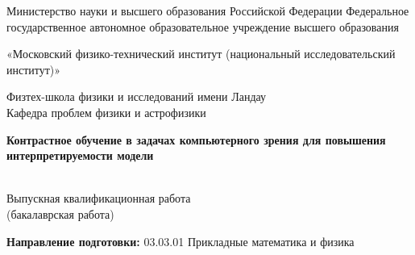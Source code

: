 \begin{titlepage}
    	\begin{center}
        		Министерство науки и высшего образования Российской Федерации Федеральное государственное автономное образовательное учреждение высшего образования
       
		«Московский физико-технический институт (национальный исследовательский институт)»

        		Физтех-школа физики и исследований имени Ландау\\
        		Кафедра проблем физики и астрофизики\\
    	\end{center}

    	\vspace{2cm}

    	\begin{center}
       		\Large \bf Контрастное обучение в задачах компьютерного зрения для повышения интерпретируемости модели
    	\end{center}
    
    	\begin{center}
		~\\[-28pt]
		Выпускная квалификационная работа\\
		(бакалаврская работа)
	\end{center}
	
	\vspace{0.1cm}
	    
    \begin{center}
    	\textbf{Направление подготовки:} 03.03.01 Прикладные математика и физика
    \end{center}

   \vspace{0.1cm}


\end{titlepage}
